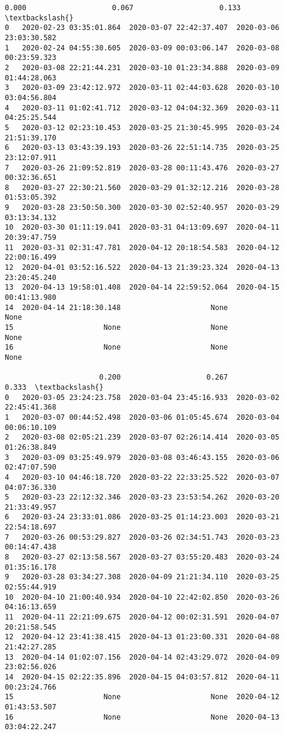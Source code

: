 \documentclass[11pt]{article}
\makeatletter
\newcommand{\boxspacing}{\kern\kvtcb@left@rule\kern\kvtcb@boxsep}
\newcommand{\prompt}[4]{
        \ttfamily\llap{{\color{#2}[#3]:\hspace{3pt}#4}}\vspace{-\baselineskip}
    }
\makeatother
\begin{document}
            \begin{tcolorbox}[breakable, size=fbox, boxrule=.5pt, pad at break*=1mm, opacityfill=0]
\prompt{Out}{outcolor}{210}{\boxspacing}
\begin{Verbatim}[commandchars=\\\{\}]
                      0.000                    0.067                    0.133  \textbackslash{}
0   2020-02-23 03:35:01.864  2020-03-07 22:42:37.407  2020-03-06 23:03:30.582
1   2020-02-24 04:55:30.605  2020-03-09 00:03:06.147  2020-03-08 00:23:59.323
2   2020-03-08 22:21:44.231  2020-03-10 01:23:34.888  2020-03-09 01:44:28.063
3   2020-03-09 23:42:12.972  2020-03-11 02:44:03.628  2020-03-10 03:04:56.804
4   2020-03-11 01:02:41.712  2020-03-12 04:04:32.369  2020-03-11 04:25:25.544
5   2020-03-12 02:23:10.453  2020-03-25 21:30:45.995  2020-03-24 21:51:39.170
6   2020-03-13 03:43:39.193  2020-03-26 22:51:14.735  2020-03-25 23:12:07.911
7   2020-03-26 21:09:52.819  2020-03-28 00:11:43.476  2020-03-27 00:32:36.651
8   2020-03-27 22:30:21.560  2020-03-29 01:32:12.216  2020-03-28 01:53:05.392
9   2020-03-28 23:50:50.300  2020-03-30 02:52:40.957  2020-03-29 03:13:34.132
10  2020-03-30 01:11:19.041  2020-03-31 04:13:09.697  2020-04-11 20:39:47.759
11  2020-03-31 02:31:47.781  2020-04-12 20:18:54.583  2020-04-12 22:00:16.499
12  2020-04-01 03:52:16.522  2020-04-13 21:39:23.324  2020-04-13 23:20:45.240
13  2020-04-13 19:58:01.408  2020-04-14 22:59:52.064  2020-04-15 00:41:13.980
14  2020-04-14 21:18:30.148                     None                     None
15                     None                     None                     None
16                     None                     None                     None

                      0.200                    0.267                    0.333  \textbackslash{}
0   2020-03-05 23:24:23.758  2020-03-04 23:45:16.933  2020-03-02 22:45:41.368
1   2020-03-07 00:44:52.498  2020-03-06 01:05:45.674  2020-03-04 00:06:10.109
2   2020-03-08 02:05:21.239  2020-03-07 02:26:14.414  2020-03-05 01:26:38.849
3   2020-03-09 03:25:49.979  2020-03-08 03:46:43.155  2020-03-06 02:47:07.590
4   2020-03-10 04:46:18.720  2020-03-22 22:33:25.522  2020-03-07 04:07:36.330
5   2020-03-23 22:12:32.346  2020-03-23 23:53:54.262  2020-03-20 21:33:49.957
6   2020-03-24 23:33:01.086  2020-03-25 01:14:23.003  2020-03-21 22:54:18.697
7   2020-03-26 00:53:29.827  2020-03-26 02:34:51.743  2020-03-23 00:14:47.438
8   2020-03-27 02:13:58.567  2020-03-27 03:55:20.483  2020-03-24 01:35:16.178
9   2020-03-28 03:34:27.308  2020-04-09 21:21:34.110  2020-03-25 02:55:44.919
10  2020-04-10 21:00:40.934  2020-04-10 22:42:02.850  2020-03-26 04:16:13.659
11  2020-04-11 22:21:09.675  2020-04-12 00:02:31.591  2020-04-07 20:21:58.545
12  2020-04-12 23:41:38.415  2020-04-13 01:23:00.331  2020-04-08 21:42:27.285
13  2020-04-14 01:02:07.156  2020-04-14 02:43:29.072  2020-04-09 23:02:56.026
14  2020-04-15 02:22:35.896  2020-04-15 04:03:57.812  2020-04-11 00:23:24.766
15                     None                     None  2020-04-12 01:43:53.507
16                     None                     None  2020-04-13 03:04:22.247


\end{Verbatim}
\end{tcolorbox}
\end{document}
